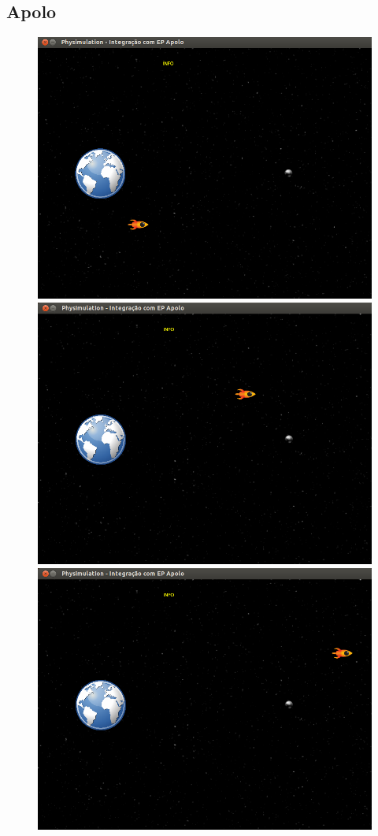 \subsection{Apolo}

\begin{figure}[H]
    \centering
	\includegraphics[scale=0.2]{images/apolo-1.png}
	\includegraphics[scale=0.2]{images/apolo-2.png}
	\includegraphics[scale=0.2]{images/apolo-3.png}

\end{figure}
